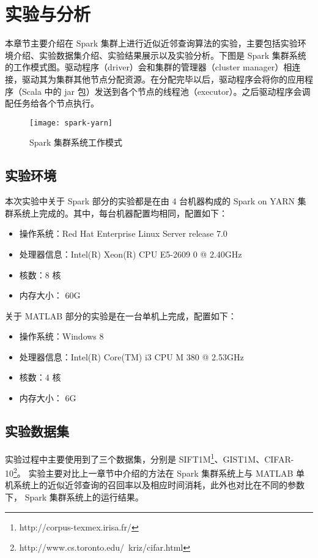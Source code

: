 

\chapter{实验与分析}
\label{cha:experiments_analysis}
本章节主要介绍在 Spark 集群上进行近似近邻查询算法的实验，主要包括实验环境介绍、实验数据集介绍、实验结果展示以及实验分析。下图是 Spark 集群系统的工作模式图。驱动程序（driver）会和集群的管理器（cluster manager）相连接，驱动其为集群其他节点分配资源。在分配完毕以后，驱动程序会将你的应用程序（Scala 中的 jar 包）发送到各个节点的线程池（executor）。之后驱动程序会调配任务给各个节点执行。
\label{cha:experiments_analysis}
\begin{figure}[H]
  \centering
  \texttt{[image: spark-yarn]}
  \caption{Spark 集群系统工作模式}
  \label{fig:spark-yarn}
\end{figure}
\section{实验环境}
本次实验中关于 Spark 部分的实验都是在由 4 台机器构成的 Spark on YARN 集群系统上完成的。其中，每台机器配置均相同，配置如下：
\begin{itemize}
\item 操作系统：Red Hat Enterprise Linux Server release 7.0
\item 处理器信息：Intel(R) Xeon(R) CPU E5-2609 0 @ 2.40GHz
\item 核数：8 核
\item 内存大小： 60G
\end{itemize}

关于 MATLAB 部分的实验是在一台单机上完成，配置如下：
\begin{itemize}
\item 操作系统：Windows 8
\item 处理器信息：Intel(R) Core(TM) i3 CPU M 380 @ 2.53GHz
\item 核数：4 核
\item 内存大小： 6G
\end{itemize}
\section{实验数据集}
实验过程中主要使用到了三个数据集，分别是 SIFT1M\footnote{http://corpus-texmex.irisa.fr/\label{fn:repeat}}、GIST1M\footnotemark[1]、CIFAR-10\footnote{http://www.cs.toronto.edu/~kriz/cifar.html}。 实验主要对比上一章节中介绍的方法在 Spark 集群系统上与 MATLAB 单机系统上的近似近邻查询的召回率以及相应时间消耗，此外也对比在不同的参数下， Spark 集群系统上的运行结果。

